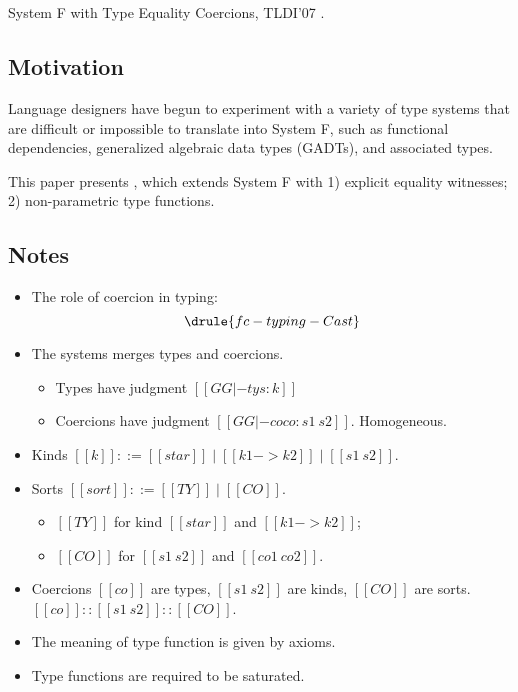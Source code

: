 \section{\FC}

System F with Type Equality Coercions, TLDI'07 \citep{Sulzmann:2007:SFT:1190315.1190324}.

\subsection{Motivation}

Language designers have begun to experiment with a variety of type systems that
are difficult or impossible to translate into System F, such as functional
dependencies, generalized algebraic data types (GADTs), and associated types.

This paper presents \FC, which extends System F with 1) explicit equality
witnesses; 2) non-parametric type functions.

\subsection{Notes}

\begin{itemize}
\item The role of coercion in typing:
  \[ \drule{fc-typing-Cast} \]
\item The systems merges types and coercions.
  \begin{itemize}
  \item Types have judgment $[[ GG |-ty s : k ]]$
  \item Coercions have judgment $[[ GG |-co co : s1 ~ s2 ]]$. Homogeneous.
  \end{itemize}
\item Kinds $[[ k ]] ::= [[star]] \mid [[k1 -> k2]] \mid [[s1 ~ s2]] $.
\item Sorts $[[ sort ]] ::= [[ TY ]] \mid [[ CO ]]$.
  \begin{itemize}
  \item  $[[ TY ]]$ for kind $[[ star ]]$ and $[[ k1 -> k2
    ]]$;
  \item  $ [[CO]] $ for $[[ s1 ~ s2 ]]$ and $[[ co1 ~ co2 ]]$.
  \end{itemize}
\item Coercions $[[co]]$ are types, $[[s1 ~ s2]]$ are kinds, $[[CO]]$ are sorts.
  $[[co]] :: [[s1 ~ s2]] :: [[CO]]$.
\item The meaning of type function is given by axioms.
\item Type functions are required to be saturated.
\end{itemize}

